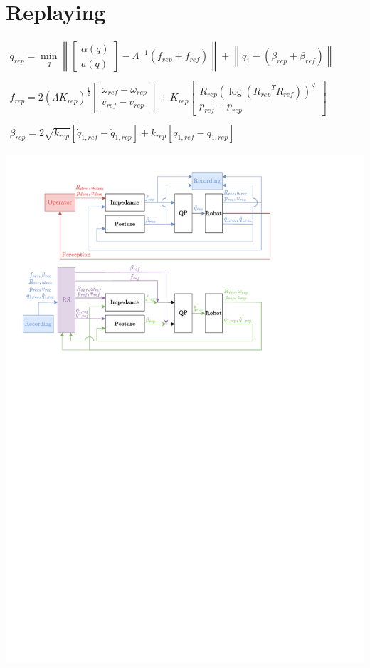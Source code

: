 \documentclass[11pt]{report}
\numberwithin{equation}{section}        %
\numberwithin{figure}{section}          %
\numberwithin{table}{section}           %
\begin{document}
\section*{Replaying}
$\begin{array}{l}
\ddot{q}_{rep} = \min\limits_{\ddot{q}}\left \|  \begin{bmatrix}
\alpha(\ddot{q})\\ 
a(\ddot{q})
\end{bmatrix} - \Lambda^{-1}(f_{rep}+f_{ref}) \right \| + \left \|\ddot{q}_1-(\beta_{rep}+\beta_{ref}) \right \|\\\\
f_{rep} =2(\Lambda K_{rep})^{\frac{1}{2}} \begin{bmatrix}
\omega_{ref} - \omega_{rep}
\\ 
v_{ref}-v_{rep}
\end{bmatrix} + K_{rep} \begin{bmatrix}
R_{rep}(\log({R_{rep}}^TR_{ref}))^{\vee }\\ 
p_{ref}-p_{rep}
\end{bmatrix}\\\\
\beta_{rep} = 2\sqrt{k_{rep}}\left [ \dot{q}_{1,ref}-\dot{q}_{1,rep}  \right ] + k_{rep}\left [ q_{1,ref}-q_{1,rep}  \right ]
\end{array}$

\includegraphics[trim={1cm 17.8cm 5cm 6.5cm}, clip]{Graphics/qp.pdf}
\\
\end{document}
